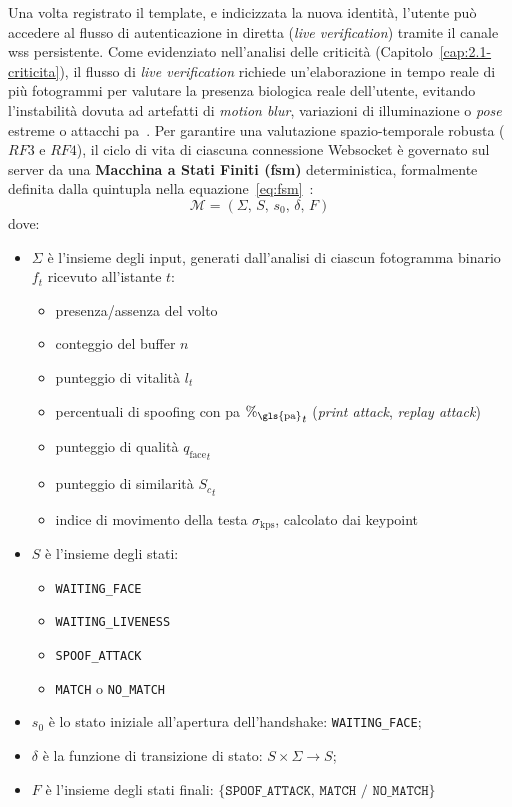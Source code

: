 \clearpage
Una volta registrato il template, e indicizzata la nuova identità, l'utente può accedere al flusso di autenticazione in diretta (\textit{live verification}) tramite il canale \gls{wss} persistente.
Come evidenziato nell'analisi delle criticità (Capitolo~\ref{cap:2.1-criticita}), il flusso di \textit{live verification} richiede un'elaborazione in tempo reale di più fotogrammi per valutare la presenza biologica reale dell'utente, evitando l'instabilità dovuta ad artefatti di \textit{motion blur}, variazioni di illuminazione o \textit{pose} estreme o attacchi \gls{pa}~\cite{liSilentFaceAntiSpoofing2024}.
Per garantire una valutazione spazio-temporale robusta ($RF3$ e $RF4$), il ciclo di vita di ciascuna connessione Websocket è governato sul server da una \textbf{Macchina a Stati Finiti (\gls{fsm})} deterministica, formalmente definita dalla quintupla nella equazione~\ref{eq:fsm}~\cite{sommerville2015software, hopcroftIntroductionAutomataTheory2007a}:
\begin{equation}
    \label{eq:fsm}
    \mathcal{M} = (\Sigma, \, S, \, s_0, \, \delta, \, F)
\end{equation}
dove:
\begin{itemize}
    \item $\Sigma$ è l'insieme degli input, generati dall'analisi di ciascun fotogramma binario $f_t$ ricevuto all'istante $t$: \begin{itemize}
        \item presenza/assenza del volto
        \item conteggio del buffer $n$
        \item punteggio di vitalità $l_t$
        \item percentuali di spoofing con \gls{pa} ${\%_{\text{\gls{pa}}}}_t$ (\textit{print attack}, \textit{replay attack})
        \item punteggio di qualità ${q_{\text{face}}}_t$
        \item punteggio di similarità ${S_c}_t$
        \item indice di movimento della testa $\sigma_{\text{kps}}$, calcolato dai keypoint
    \end{itemize}
    \item $S$ è l'insieme degli stati:\begin{itemize}
        \item \texttt{WAITING\_FACE}
        \item \texttt{WAITING\_LIVENESS}
        \item \texttt{SPOOF\_ATTACK}
        \item \texttt{MATCH} o \texttt{NO\_MATCH}
    \end{itemize}
    \item $s_0$ è lo stato iniziale all'apertura dell'handshake: \texttt{WAITING\_FACE};
    \item $\delta$ è la funzione di transizione di stato: $S \times \Sigma \rightarrow S$;
    \item $F$ è l'insieme degli stati finali: $\{\texttt{SPOOF\_ATTACK}, \, \texttt{MATCH / NO\_MATCH}\}$
\end{itemize}
